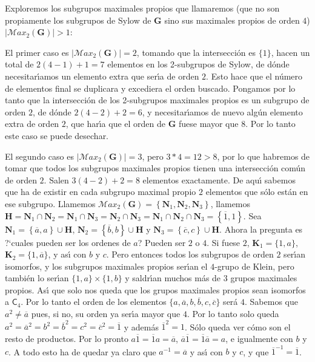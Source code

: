 \documentclass[final,12pt,a4paper,twoside,fleqn]{extbook}
\newcommand{\grG}{\ensuremath{\mathbf{G}}}
\newcommand{\grH}{\ensuremath{\mathbf{H}}}
\newcommand{\grK}{\ensuremath{\mathbf{K}}}
\newcommand{\grN}{\ensuremath{\mathbf{N}}}
\newcommand{\grclass}[1]{\ensuremath{\mathsf{#1}}}
\newcommand{\cyclicgr}[1]{\ensuremath{{\grclass{C}}_{#1}}}
\theoremstyle{definition}
\theoremstyle{remark}
\begin{document}
    Exploremos los subgrupos maximales propios que llamaremos (que no son propiamente los subgrupos de Sylow de
    $\grG$ sino sus maximales propios de orden $4$) $\left| {{\mathcal{M}ax}_{2}}(\grG)\right|>1$:

    El primer caso es $\left| {{\mathcal{M}ax}_{2}}(\grG)\right|=2$,
tomando que la intersecci\'on es $\{1\}$, hacen un total de $2(4-1)+1=7$ elementos
en los 2-subgrupos de Sylow, de d\'onde necesitar{\'{\i}}amos un elemento extra que ser{\'{\i}}a
de orden $2$. Esto hace que el n\'umero de elementos final se duplicara y excediera
el orden buscado. Pongamos por lo tanto que la intersecci\'on de los 2-subgrupos maximales propios
es un subgrupo de orden $2$, de d\'onde $2(4-2)+2=6$, y necesitar{\'{\i}}amos de nuevo
alg\'un elemento extra de orden $2$, que har{\'{\i}}a que el orden de $\grG$ fuese mayor que $8$.
Por lo tanto este caso se puede desechar.

    El segundo caso es $\left| {{\mathcal{M}ax}_{2}}(\grG)\right|=3$, pero $3*4=12 > 8$,
por lo que habremos de tomar que todos los subgrupos maximales propios tienen una intersecci\'on
com\'un de orden $2$. Salen $3(4-2)+2=8$ elementos exactamente. De aqu{\'{\i}} sabemos
que ha de existir en cada subgrupo maximal propio $2$ elementos que s\'olo est\'an en ese subgrupo.
Llamemos $ {{\mathcal{M}ax}_{2}}\left(\grG\right)=\left\{ \grN_1,\grN_2,\grN_3 \right\} $,
llamemos
$\grH = \grN_1          \cap \grN_2 = \grN_1       \cap \grN_3 = \grN_2        \cap \grN_3 =
\grN_1        \cap \grN_2       \cap \grN_3 = \left\{ \overline{1},1 \right\}$.
Sea $\grN_1=\left\{ \overline{a},a\right\}       \cup       \grH$, $\grN_2=\left\{\overline{b},b\right\}       \cup       \grH$ y
$\grN_3=\left\{ \overline{c},c\right\}      \cup       \grH$. Ahora la pregunta es ?`cuales pueden ser los
ordenes de $a$? Pueden ser $2$ o $4$. Si fuese $2$, $\grK_1 = \{1,a\}$, $\grK_2 = \{1,\overline{a}\}$,
y as{\'{\i}} con $b$ y $c$. Pero entonces todos los subgrupos de orden $2$ ser{\'{\i}}an isomorfos,
y los subgrupos maximales propios ser{\'{\i}}an el $4$-grupo de Klein, pero
tambi\'en lo ser{\'{\i}}an $\{1,a\}        \times        \{1,b\}$ y saldr{\'{\i}}an muchos m\'as de $3$ grupos maximales propios.
As{\'{\i}} que solo nos queda que los
grupos maximales propios sean isomorfos a $\cyclicgr{4}$.
Por lo tanto el orden de los elementos $\{a,\overline{a},b,\overline{b},c,\overline{c}\}$
ser\'a $4$. Sabemos que $a^2       \neq       \overline{a}$ pues, si no, su orden ya
ser{\'{\i}}a mayor que $4$. Por lo tanto solo queda
$a^2=\overline{a}^2=b^2=\overline{b}^2=c^2=\overline{c}^2=\overline{1}$ y
adem\'as $\overline{1}^2=1$. S\'olo queda ver c\'omo son el resto de productos. Por lo pronto
$a\overline{1}=\overline{1}a=\overline{a}$, $\overline{a}\overline{1}=\overline{1}\overline{a}=a$,
e igualmente con $b$ y $c$. A todo esto ha de quedar ya claro que $a^{-1}=\overline{a}$
y as{\'{\i}} con $b$ y $c$, y que $\overline{1}^{-1}=\overline{1}$.
\end{document}

